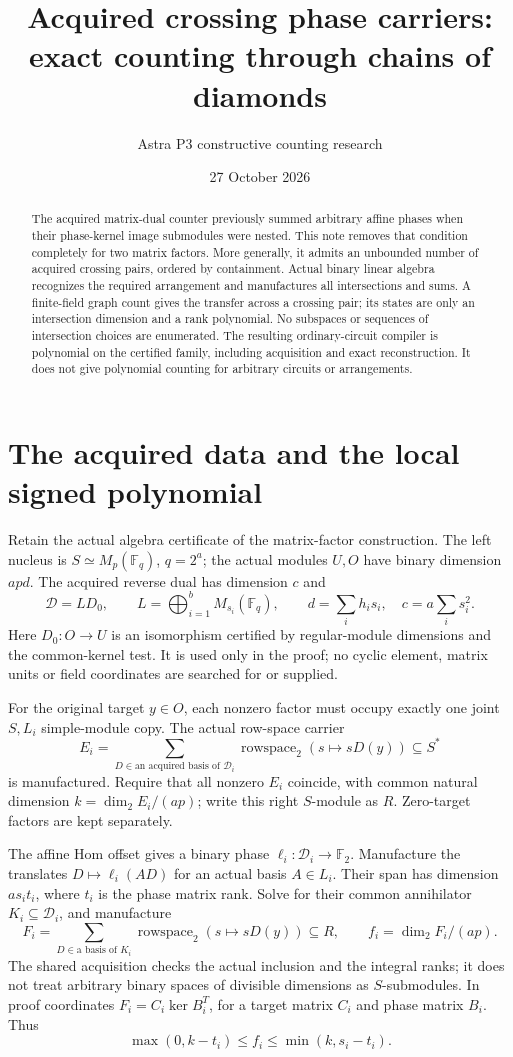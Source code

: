 \documentclass[11pt]{article}
\title{Acquired crossing phase carriers: exact counting through chains of diamonds}
\author{Astra P3 constructive counting research}\date{27 October 2026}
\newcommand{\F}{\mathbb F}\newcommand{\rank}{\operatorname{rank}}
\begin{document}
\maketitle
\begin{abstract}
The acquired matrix-dual counter previously summed arbitrary affine phases
when their phase-kernel image submodules were nested. This note removes that
condition completely for two matrix factors. More generally, it admits an
unbounded number of acquired crossing pairs, ordered by containment. Actual
binary linear algebra recognizes the required arrangement and manufactures
all intersections and sums. A finite-field graph count gives the transfer
across a crossing pair; its states are only an intersection dimension and a
rank polynomial. No subspaces or sequences of intersection choices are
enumerated. The resulting ordinary-circuit compiler is polynomial on the
certified family, including acquisition and exact reconstruction. It does
not give polynomial counting for arbitrary circuits or arrangements.
\end{abstract}

\section{The acquired data and the local signed polynomial}
Retain the actual algebra certificate of the matrix-factor construction.
The left nucleus is $S\simeq M_p(\F_q)$, $q=2^a$; the actual modules $U,O$
have binary dimension $apd$. The acquired reverse dual has dimension $c$ and
\[
 \mathcal D=LD_0,\qquad
 L=\bigoplus_{i=1}^bM_{s_i}(\F_q),\qquad
 d=\sum_i h_i s_i,\quad c=a\sum_i s_i^2.
\]
Here $D_0:O\to U$ is an isomorphism certified by regular-module dimensions
and the common-kernel test. It is used only in the proof; no cyclic element,
matrix units or field coordinates are searched for or supplied.

For the original target $y\in O$, each nonzero factor must occupy exactly
one joint $S,L_i$ simple-module copy. The actual row-space carrier
\[
 E_i=\sum_{D\in\text{an acquired basis of }\mathcal D_i}
       \operatorname{rowspace}_2(s\mapsto sD(y))\subseteq S^*
\]
is manufactured. Require that all nonzero $E_i$ coincide, with common
natural dimension $k=\dim_2E_i/(ap)$; write this right $S$-module as $R$.
Zero-target factors are kept separately.

The affine Hom offset gives a binary phase $\ell_i:\mathcal D_i\to\F_2$.
Manufacture the translates $D\mapsto\ell_i(AD)$ for an actual basis
$A\in L_i$. Their span has dimension $as_it_i$, where $t_i$ is the phase
matrix rank. Solve for their common annihilator $K_i\subseteq\mathcal D_i$,
and manufacture
\[
 F_i=\sum_{D\in\text{a basis of }K_i}
       \operatorname{rowspace}_2(s\mapsto sD(y))\subseteq R,
 \qquad f_i=\dim_2F_i/(ap).
\]
The shared acquisition checks the actual inclusion and the integral ranks;
it does not treat arbitrary binary spaces of divisible dimensions as
$S$-submodules. In proof coordinates $F_i=C_i\ker B_i^T$, for a target
matrix $C_i$ and phase matrix $B_i$. Thus
\[
 \max(0,k-t_i)\le f_i\le\min(k,s_i-t_i).
\]
\end{document}
